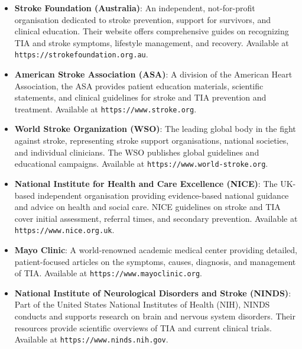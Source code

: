 \begin{itemize}
    \item \textbf{Stroke Foundation (Australia)}: An independent, not-for-profit organisation dedicated to stroke prevention, support for survivors, and clinical education. Their website offers comprehensive guides on recognizing TIA and stroke symptoms, lifestyle management, and recovery. Available at \texttt{https://strokefoundation.org.au}.

    \item \textbf{American Stroke Association (ASA)}: A division of the American Heart Association, the ASA provides patient education materials, scientific statements, and clinical guidelines for stroke and TIA prevention and treatment. Available at \texttt{https://www.stroke.org}.

    \item \textbf{World Stroke Organization (WSO)}: The leading global body in the fight against stroke, representing stroke support organisations, national societies, and individual clinicians. The WSO publishes global guidelines and educational campaigns. Available at \texttt{https://www.world-stroke.org}.

    \item \textbf{National Institute for Health and Care Excellence (NICE)}: The UK-based independent organisation providing evidence-based national guidance and advice on health and social care. NICE guidelines on stroke and TIA cover initial assessment, referral times, and secondary prevention. Available at \texttt{https://www.nice.org.uk}.

    \item \textbf{Mayo Clinic}: A world-renowned academic medical center providing detailed, patient-focused articles on the symptoms, causes, diagnosis, and management of TIA. Available at \texttt{https://www.mayoclinic.org}.

    \item \textbf{National Institute of Neurological Disorders and Stroke (NINDS)}: Part of the United States National Institutes of Health (NIH), NINDS conducts and supports research on brain and nervous system disorders. Their resources provide scientific overviews of TIA and current clinical trials. Available at \texttt{https://www.ninds.nih.gov}.
\end{itemize}
